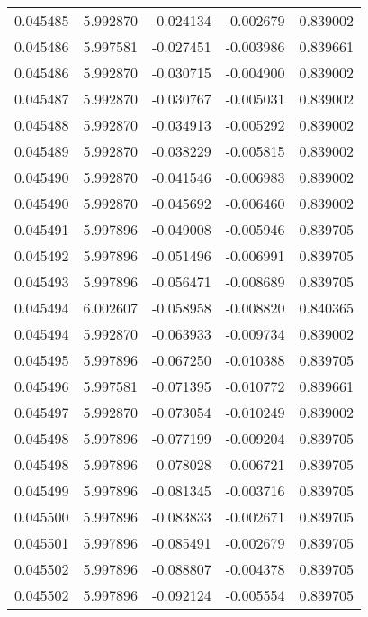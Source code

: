 \begin{tabular}{lrrrr}
0.045485    &  5.992870 & -0.024134 & -0.002679 &             0.839002 \\
0.045486    &  5.997581 & -0.027451 & -0.003986 &             0.839661 \\
0.045486    &  5.992870 & -0.030715 & -0.004900 &             0.839002 \\
0.045487    &  5.992870 & -0.030767 & -0.005031 &             0.839002 \\
0.045488    &  5.992870 & -0.034913 & -0.005292 &             0.839002 \\
0.045489    &  5.992870 & -0.038229 & -0.005815 &             0.839002 \\
0.045490    &  5.992870 & -0.041546 & -0.006983 &             0.839002 \\
0.045490    &  5.992870 & -0.045692 & -0.006460 &             0.839002 \\
0.045491    &  5.997896 & -0.049008 & -0.005946 &             0.839705 \\
0.045492    &  5.997896 & -0.051496 & -0.006991 &             0.839705 \\
0.045493    &  5.997896 & -0.056471 & -0.008689 &             0.839705 \\
0.045494    &  6.002607 & -0.058958 & -0.008820 &             0.840365 \\
0.045494    &  5.992870 & -0.063933 & -0.009734 &             0.839002 \\
0.045495    &  5.997896 & -0.067250 & -0.010388 &             0.839705 \\
0.045496    &  5.997581 & -0.071395 & -0.010772 &             0.839661 \\
0.045497    &  5.992870 & -0.073054 & -0.010249 &             0.839002 \\
0.045498    &  5.997896 & -0.077199 & -0.009204 &             0.839705 \\
0.045498    &  5.997896 & -0.078028 & -0.006721 &             0.839705 \\
0.045499    &  5.997896 & -0.081345 & -0.003716 &             0.839705 \\
0.045500    &  5.997896 & -0.083833 & -0.002671 &             0.839705 \\
0.045501    &  5.997896 & -0.085491 & -0.002679 &             0.839705 \\
0.045502    &  5.997896 & -0.088807 & -0.004378 &             0.839705 \\
0.045502    &  5.997896 & -0.092124 & -0.005554 &             0.839705 \\

\end{tabular}
